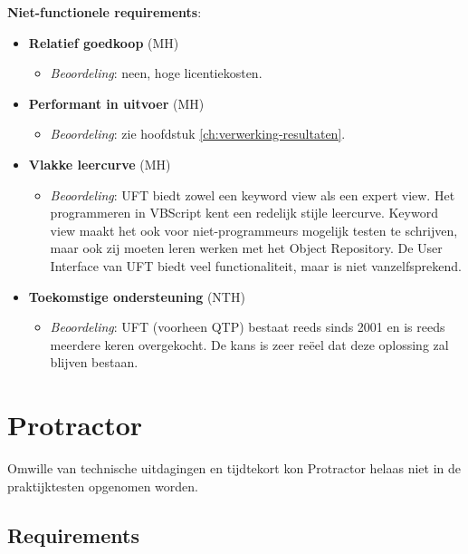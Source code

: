 \textbf{Niet-functionele requirements}:
\begin{itemize}
	\item \textbf{Relatief goedkoop} (MH)
	\begin{itemize}
		\item \emph{Beoordeling}: neen, hoge licentiekosten.
	\end{itemize}
	\item \textbf{Performant in uitvoer} (MH)
	\begin{itemize}
		\item \emph{Beoordeling}: zie hoofdstuk \ref{ch:verwerking-resultaten}.
	\end{itemize}
	\item \textbf{Vlakke leercurve} (MH)
	\begin{itemize}
		\item \emph{Beoordeling}: UFT biedt zowel een keyword view als een expert view. Het programmeren in VBScript kent een redelijk stijle leercurve. Keyword view maakt het ook voor niet-programmeurs mogelijk testen te schrijven, maar ook zij moeten leren werken met het Object Repository. De User Interface van UFT biedt veel functionaliteit, maar is niet vanzelfsprekend.
	\end{itemize}
	\item \textbf{Toekomstige ondersteuning} (NTH)
	\begin{itemize}
		\item \emph{Beoordeling}: UFT (voorheen QTP) bestaat reeds sinds 2001 en is reeds meerdere keren overgekocht. De kans is zeer reëel dat deze oplossing zal blijven bestaan.
	\end{itemize}
\end{itemize}

\section{Protractor}

Omwille van technische uitdagingen en tijdtekort kon Protractor helaas niet in de praktijktesten opgenomen worden.

\subsection{Requirements}

